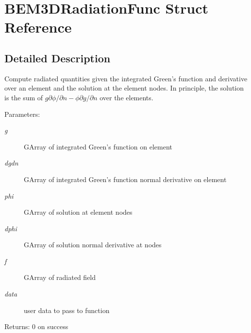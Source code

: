 \section{BEM3DRadiationFunc Struct Reference}
\label{structBEM3DRadiationFunc}


\subsection{Detailed Description}
Compute radiated quantities given the integrated Green's function and derivative over an element and the solution at the element nodes. In principle, the solution is the sum of $g{\partial\phi}/{\partial n}-\phi \partial g/\partial n$ over the elements.

\begin{Desc}
\item[Parameters:]
\begin{description}
\item[{\em g}]GArray of integrated Green's function on element \item[{\em dgdn}]GArray of integrated Green's function normal derivative on element \item[{\em phi}]GArray of solution at element nodes \item[{\em dphi}]GArray of solution normal derivative at nodes \item[{\em f}]GArray of radiated field \item[{\em data}]user data to pass to function\end{description}
\end{Desc}
\begin{Desc}
\item[Returns:]0 on success \end{Desc}
